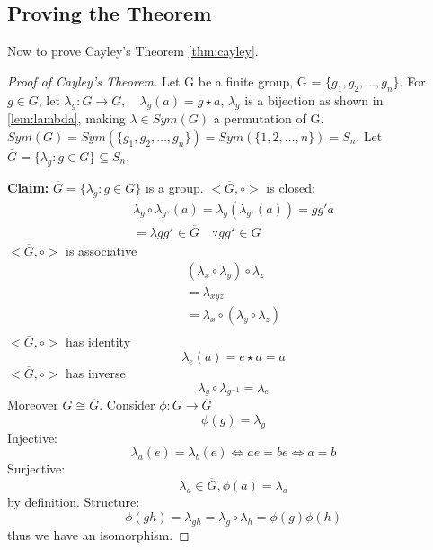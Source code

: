 \documentclass[12pt]{article}
\begin{document}
\subsection*{Proving the Theorem}
Now to prove Cayley's Theorem \ref{thm:cayley}.
\begin{proof}[Proof of Cayley's Theorem]
    Let G be a finite group, G = \(\{g_1, g_2, \dots, g_n\}\). 
    For \(g \in G\), let \(\lambda_g:G \to G, \quad \lambda_g(a) = g\star a\), 
    \(\lambda_g\) is a bijection as shown in \ref{lem:lambda}, making 
    \(\lambda \in Sym(G)\) a permutation of G. 
    \(Sym(G) = Sym(\{g_1, g_2, \dots, g_n\}) = Sym(\{1,2,\dots, n\}) = S_n\).
    Let \(\overline{G} = \{\lambda_g : g\in  G\} \subseteq S_n\). 

    \noindent
    \textbf{Claim: } \(\overline{G} = \{\lambda_g : g\in G\}\) is a group. 
    \(<\overline{G}, \circ>\) is closed:
    \begin{gather*}
        \lambda_g \circ \lambda_{g^\star}(a) = \lambda_g(\lambda_{g^\star}(a)) = gg'a \\
        = \lambda{gg^\star} \in \overline{G} \quad \because gg^\star \in G
    \end{gather*}
    \(<\overline{G},\circ>\) is associative
    \begin{gather*}
        (\lambda_{x} \circ \lambda_{y}) \circ \lambda_{z} \\ 
        = \lambda_{xyz} \\ 
        = \lambda_{x} \circ (\lambda_{y} \circ \lambda_{z}) \\ 
    \end{gather*}
    \(<\overline{G},\circ>\) has identity  
    \[ 
        \lambda_e(a) = e \star a = a 
    \]
    \(<\overline{G}, \circ>\) has inverse 
    \[ 
        \lambda_g \circ \lambda_{g^{-1}} = \lambda_e
    \]
    Moreover \(G \cong \overline{G}\). 
    Consider \(\phi: G \to \overline{G}\) 
    \[ 
        \phi(g) = \lambda_g
    \]
    Injective: 
    \[ 
        \lambda_a(e) = \lambda_b(e) \Leftrightarrow ae = be \Leftrightarrow a = b
    \]
    Surjective: 
    \[ 
        \lambda_a \in \overline{G}, \phi(a) = \lambda_a
    \]
    by definition.
    Structure: 
    \[ 
        \phi(gh) = \lambda_{gh} = \lambda_g \circ \lambda_h = \phi(g)\phi(h)
    \]
    thus we have an isomorphism.

\end{proof}
\end{document}
